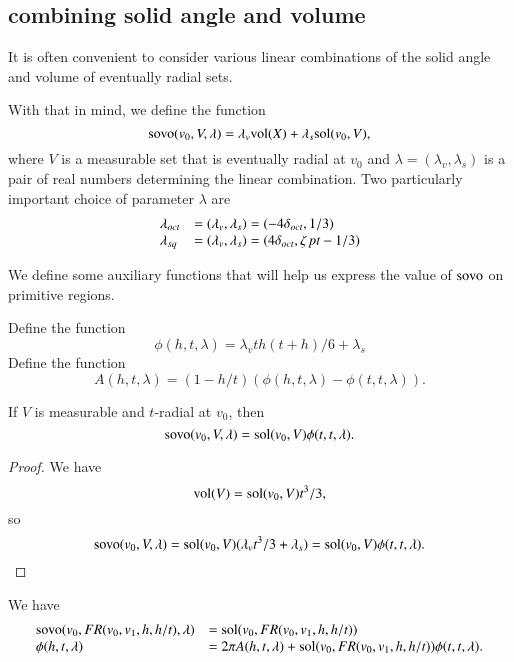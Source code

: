 \subsection{combining solid angle and volume}

It is often convenient to consider various linear combinations
of the solid angle and volume of eventually radial sets.  

\begin{definition}\label{def:sovo}
With
that in mind, we define the function
  $$
  {\operatorname{sovo}}(v_0,V,\lambda) = \lambda_v {\operatorname{vol}}(X) + \lambda_s
  {\operatorname{sol}}(v_0,V),
  $$
where $V$ is a measurable set that is eventually radial at $v_0$
and $\lambda=(\lambda_v,\lambda_s)$ is a pair of real numbers
determining the linear combination.
Two particularly important choice of parameter $\lambda$ are
$$
 \begin{array}{lll}
 \lambda_{oct}&=(\lambda_v,\lambda_s)=(-4\delta_{oct},1/3)\\
 \lambda_{sq}& =(\lambda_v,\lambda_s)=(4\delta_{oct},\zeta\,\hbox{\it pt}-1/3)\\
 \end{array}
$$
\end{definition}

We define some auxiliary functions that will help us express
the value of ${\operatorname{sovo}}$ on primitive regions.

\begin{definition}
Define the function
 $$
 \phi(h,t,\lambda)=
   \lambda_v  t h (t+h)/6 + \lambda_s 
 $$
Define the function
 $$A(h,t,\lambda) = (1-h/t) (\phi(h,t,\lambda) - \phi(t,t,\lambda)).$$
\end{definition}

\begin{lemma} If $V$ is measurable and $t$-radial at $v_0$,
then $${\operatorname{sovo}}(v_0,V,\lambda) = {\operatorname{sol}}(v_0,V)\phi(t,t,\lambda).$$
\end{lemma}

\begin{proof} We have $${\operatorname{vol}}(V) = {\operatorname{sol}}(v_0,V)t^3/3,$$
so $${\operatorname{sovo}}(v_0,V,\lambda) = 
  {\operatorname{sol}}(v_0,V)(\lambda_v t^3/3 + \lambda_s) = 
   {\operatorname{sol}}(v_0,V)\phi(t,t,\lambda).$$
\end{proof}

\begin{lemma} 
  We have
  $$
  \begin{array}{lll}
  {\operatorname{sovo}}(v_0,FR(v_0,v_1,h,h/t),\lambda) 
   &= {\operatorname{sol}}(v_0,FR(v_0,v_1,h,h/t))\\
  \phi(h,t,\lambda) 
   &= 2\pi A(h,t,\lambda) + \operatorname{sol}(v_0,FR(v_0,v_1,h,h/t))\phi(t,t,\lambda).
  \end{array}
  $$
\end{lemma}

